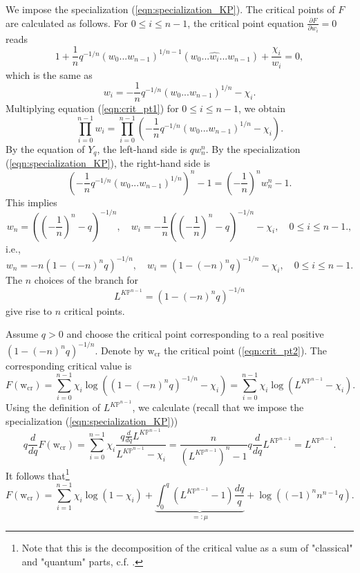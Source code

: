 \documentclass[12pt]{amsart}
\numberwithin{equation}{section}
\newcommand{\KP}{K\mathbb{P}}
\begin{document}
We impose the specialization (\ref{eqn:specialization_KP}). The critical points of $F$ are calculated as follows. For $0\leq i\leq n-1$, the critical point equation $\frac{\partial F}{\partial w_i}=0$ reads 
\begin{equation*}
1+\frac{1}{n}q^{-1/n}(w_0...w_{n-1})^{1/n-1}(w_0...\widehat{w_i}...w_{n-1})+\frac{\chi_i}{w_i}=0,     
\end{equation*}
which is the same as 
\begin{equation}\label{eqn:crit_pt1}
w_i=-\frac{1}{n}q^{-1/n}(w_0...w_{n-1})^{1/n}-\chi_i.    
\end{equation}
Multiplying equation (\ref{eqn:crit_pt1}) for $0\leq i\leq n-1$, we obtain
\begin{equation*}
\prod_{i=0}^{n-1}w_i=\prod_{i=0}^{n-1}\left(-\frac{1}{n}q^{-1/n}(w_0...w_{n-1})^{1/n}-\chi_i\right).     
\end{equation*}
By the equation of $Y_q$, the left-hand side is $qw_n^n$. By the specialization (\ref{eqn:specialization_KP}), the right-hand side is 
\begin{equation*}
\left(-\frac{1}{n}q^{-1/n}(w_0...w_{n-1})^{1/n}\right)^n-1=\left(-\frac{1}{n}\right)^n w_n^n-1.    
\end{equation*}
This implies 
\begin{equation*}
w_n=\left(\left(-\frac{1}{n}\right)^n-q\right)^{-1/n}, \quad w_i=-\frac{1}{n}\left(\left(-\frac{1}{n}\right)^n-q\right)^{-1/n}-\chi_i, \quad 0\leq i\leq n-1.,    
\end{equation*}
i.e.,
\begin{equation}\label{eqn:crit_pt2}
w_n=-n(1-(-n)^nq)^{-1/n}, \quad w_i=(1-(-n)^nq)^{-1/n}-\chi_i, \quad 0\leq i\leq n-1.    
\end{equation}
The $n$ choices of the branch for $$L^{\KP^{n-1}}=(1-(-n)^nq)^{-1/n}$$ give rise to $n$ critical points.

Assume $q>0$ and choose the critical point corresponding to a real positive $(1-(-n)^nq)^{-1/n}$. Denote by $\mathrm{w}_{\text{cr}}$ the critical point (\ref{eqn:crit_pt2}). The corresponding critical value is 
\begin{equation*}
F(\mathrm{w}_{\text{cr}})=\sum_{i=0}^{n-1}\chi_i\log \left((1-(-n)^nq)^{-1/n}-\chi_i\right)=\sum_{i=0}^{n-1}\chi_i\log(L^{\KP^{n-1}}-\chi_i).    
\end{equation*}
Using the definition of $L^{\KP^{n-1}}$, we calculate (recall that we impose the specialization (\ref{eqn:specialization_KP}))
\begin{equation*}
q\frac{d}{dq} F(\mathrm{w}_{\text{cr}})=\sum_{i=0}^{n-1}\chi_i\frac{q\frac{d}{dq}L^{\KP^{n-1}}}{L^{\KP^{n-1}}-\chi_i}=\frac{n}{(L^{\KP^{n-1}})^n-1}q\frac{d}{dq}L^{\KP^{n-1}}=L^{\KP^{n-1}}.    
\end{equation*}
It follows that\footnote{Note that this is the decomposition of the critical value as a sum of "classical" and "quantum" parts, c.f. \cite[Lemma 6.4]{ccit_toric3}.} 
\begin{equation*}
F(\mathrm{w}_{\text{cr}})=\sum_{i=1}^{n-1}\chi_i\log(1-\chi_i)+\underbrace{\int_0^q \left(L^{\KP^{n-1}}-1\right)\frac{dq}{q}}_{=:\mu}+\log((-1)^nn^{n-1}q).    
\end{equation*}
\end{document}
